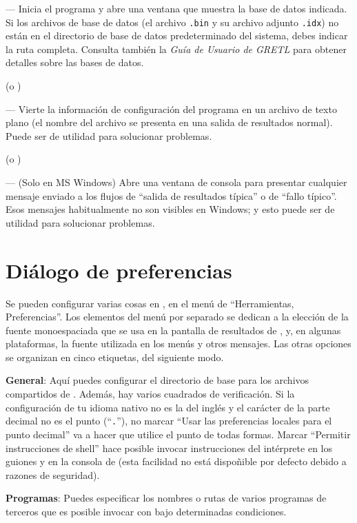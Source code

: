 --- Inicia el programa y abre una ventana que muestra la base de datos indicada.
Si los archivos de base de datos (el archivo \texttt{.bin} y su archivo
adjunto \texttt{.idx}) no están en el directorio de base de datos predeterminado
del sistema, debes indicar la ruta completa. Consulta también la
\emph{Guía de Usuario de GRETL} para obtener detalles sobre las bases de datos.
      
 (o )
      
--- Vierte la información de configuración del programa en un archivo de texto plano
(el nombre del archivo se presenta en una salida de resultados normal). Puede ser de
utilidad para solucionar problemas.
      
 (o )

--- (Solo en MS Windows) Abre una ventana de consola para presentar cualquier
mensaje enviado a los flujos de ``salida de resultados típica'' o de
``fallo típico''. Esos mensajes habitualmente no son visibles en Windows;
y esto puede ser de utilidad para solucionar problemas.
      
\section{Diálogo de preferencias}
\label{guiprefs}

Se pueden configurar varias cosas en , en el menú de
``Herramientas, Preferencias''. Los elementos del menú por separado se dedican a la
elección de la fuente monoespaciada que se usa en la pantalla de resultados de ,
y, en algunas plataformas, la fuente utilizada en los menús y otros mensajes.
Las otras opciones se organizan en cinco etiquetas, del siguiente modo.
      
\textbf{General}: Aquí puedes configurar el directorio de base para los archivos
compartidos de . Además, hay varios cuadrados de verificación.
Si la configuración de tu idioma nativo no es la del inglés y el carácter de la
parte decimal no es el punto (``\texttt{.}''), no marcar ``Usar las preferencias
locales para el punto decimal'' va a hacer que  utilice el punto de
todas formas. Marcar ``Permitir instrucciones de shell'' hace posible
invocar instrucciones del intérprete en los guiones y en la consola de 
(esta facilidad no está dispoñible por defecto debido a razones de seguridad).
      
\textbf{Programas}: Puedes especificar los nombres o rutas de varios programas
de terceros que es posible invocar con  bajo determinadas
condiciones.

